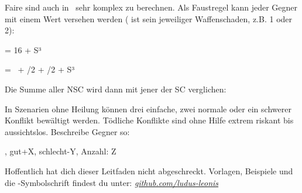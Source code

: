 {		Faire  sind auch in \nipajin\ sehr komplex zu berechnen. Als Faustregel kann jeder Gegner mit einem Wert versehen werden ( ist sein jeweiliger Waffenschaden, z.B. 1 oder 2):

		\vspace{3pt}
		\centerline{ = 16 + S³}
		\vspace{3pt}
		\centerline{ = \HD\ + \AD/2 + \RD/2 + S³}
		\vspace{3pt}

		\noindent
		Die Summe aller NSC wird dann mit jener der SC verglichen:


		\noindent
		In Szenarien ohne Heilung können drei einfache, zwei normale oder ein schwerer Konflikt bewältigt werden. Tödliche Konflikte sind ohne Hilfe extrem riskant bis aussichtslos. Beschreibe Gegner so:

		, gut+X, schlecht-Y, Anzahl: Z


		\noindent
		Hoffentlich hat dich dieser Leitfaden nicht abgeschreckt. Vorlagen, Beispiele und die \nipajin-Symbolschrift findest du unter:  \href{https://github.com/ludus-leonis}{\emph{github.com/ludus-leonis}}

}
